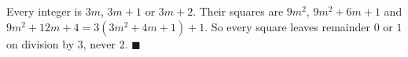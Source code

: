 Every integer is $3m$, $3m+1$ or $3m+2$. Their squares are $9m^2$, $9m^2+6m+1$ and $9m^2+12m+4=3(3m^2+4m+1)+1$. So every square leaves remainder $0$ or $1$ on division by $3$, never $2$. $\blacksquare$
